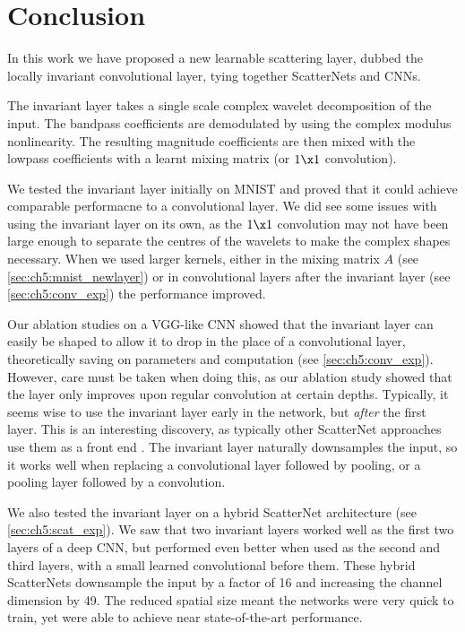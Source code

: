 \section{Conclusion}\label{sec:ch5:conclusion}
In this work we have proposed a new learnable scattering layer, dubbed the
locally invariant convolutional layer, tying together ScatterNets and CNNs.

The invariant layer takes a single scale complex wavelet decomposition of the
input. The bandpass coefficients are demodulated by using the complex modulus
nonlinearity. The resulting magnitude coefficients are then mixed with the
lowpass coefficients with a learnt mixing matrix (or $1\x 1$ convolution). 

We tested the invariant layer initially on MNIST and proved that it could
achieve comparable performacne to a convolutional layer.
We did see some issues with using the invariant layer on its own, as the $1\x 1$
convolution may not have been large enough to separate the centres of the
wavelets to make the complex shapes necessary. When we used larger kernels,
either in the mixing matrix $A$ (see \autoref{sec:ch5:mnist_newlayer}) or in
convolutional layers after the invariant layer (see \autoref{sec:ch5:conv_exp})
the performance improved.

Our ablation studies on a VGG-like CNN showed that the invariant layer can
easily be shaped to allow it to drop in the place of a convolutional layer,
theoretically saving on parameters and computation (see \autoref{sec:ch5:conv_exp}).
However, care must be taken when doing this, as our ablation study showed that
the layer only improves upon regular convolution at certain depths. Typically,
it seems wise to use the invariant layer early in the network, but \emph{after} the
first layer. This is an interesting discovery, as typically other ScatterNet
approaches use them as a front end \cite{oyallon_scaling_2017, singh_scatternet_2017}. The invariant layer naturally
downsamples the input, so it works well when replacing a convolutional layer
followed by pooling, or a pooling layer followed by a convolution. 

We also tested the invariant layer on a hybrid ScatterNet architecture (see
\autoref{sec:ch5:scat_exp}). We saw that two invariant layers worked well as the
first two layers of a deep CNN, but performed even better when used as the
second and third layers, with a small learned convolutional before them. These
hybrid ScatterNets downsample the input by a factor of 16 and increasing the
channel dimension by 49. The reduced spatial size meant the networks were very
quick to train, yet were able to achieve near state-of-the-art performance.


